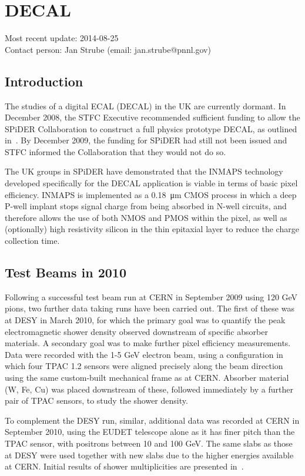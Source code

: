 \section{DECAL}
Most recent update: 2014-08-25 \\
Contact person: Jan Strube (email: jan.strube@pnnl.gov)

\subsection{Introduction}
The studies of a digital ECAL (DECAL) in the UK are currently dormant. In December 2008, the STFC Executive recommended sufficient funding
to allow the SPiDER Collaboration to construct a full physics prototype DECAL, as outlined
in~\cite{Adloff:2010aa}. By December 2009, the funding for SPiDER had still not been issued and STFC
informed the Collaboration that they would not do so.

The UK groups in SPiDER have demonstrated that the INMAPS technology developed
specifically for the DECAL application is viable in terms of basic pixel efficiency. INMAPS is
implemented as a \SI{0.18}{\micro\meter} CMOS process in which a deep P-well implant stops signal charge
from being absorbed in N-well circuits, and therefore allows the use of both NMOS and
PMOS within the pixel, as well as (optionally) high resistivity silicon in the thin epitaxial
layer to reduce the charge collection time.

\subsection{Test Beams in 2010}
Following a successful test beam run at CERN in September 2009 using 120 GeV pions, two
further data taking runs have been carried out. The first of these was at DESY in March
2010, for which the primary goal was to quantify the peak electromagnetic shower density
observed downstream of specific absorber materials. A secondary goal was to make further
pixel efficiency measurements. Data were recorded with the 1-5 GeV electron beam, using a
configuration in which four TPAC 1.2 sensors were aligned precisely along the beam direction
using the same custom-built mechanical frame as at CERN. Absorber material (W, Fe, Cu)
was placed downstream of these, followed immediately by a further pair of TPAC sensors, to
study the shower density.

To complement the DESY run, similar, additional data was recorded at CERN in September 2010, using the EUDET telescope alone as it has finer pitch than the TPAC sensor, with positrons between 10 and 100 GeV. The same slabs as those at DESY were used together with
new slabs due to the higher energies available at CERN. Initial results of shower multiplicities
are presented in~\cite{Price:2012vta}.

